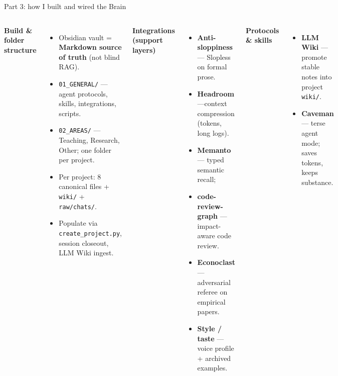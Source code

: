 \begin{frame}[t]{Part 3: how I built and wired the Brain}
  \footnotesize
  \begin{columns}[T,onlytextwidth]
      \textbf{Build \& folder structure}
      \begin{itemize}\setlength\itemsep{0.08em}
        \item Obsidian vault = \textbf{Markdown source of truth} (not blind RAG).
        \item \texttt{01\_GENERAL/} --- agent protocols, skills, integrations, scripts.
        \item \texttt{02\_AREAS/} --- Teaching, Research, Other; one folder per project.
        \item Per project: 8 canonical files + \texttt{wiki/} + \texttt{raw/chats/}.
        \item Populate via \texttt{create\_project.py}, session closeout, LLM Wiki ingest.
      \end{itemize}
      \textbf{Integrations (support layers)}
      \begin{itemize}\setlength\itemsep{0.06em}
        \item \textbf{Anti-sloppiness} --- Slopless on formal prose.
        \item \textbf{Headroom} ---context compression (tokens, long logs).
        \item \textbf{Memanto} --- typed semantic recall; 
        \item \textbf{code-review-graph} --- impact-aware code review.
        \item \textbf{Econoclast} --- adversarial referee on empirical papers.
        \item \textbf{Style / taste} --- voice profile + archived examples.
      \end{itemize}
      \textbf{Protocols \& skills}
      \begin{itemize}\setlength\itemsep{0.08em}
        \item \textbf{LLM Wiki} --- promote stable notes into project \texttt{wiki/}.
        \item \textbf{Caveman} --- terse agent mode; saves tokens, keeps substance.
        

\end{itemize}
\end{columns}
\end{frame}
